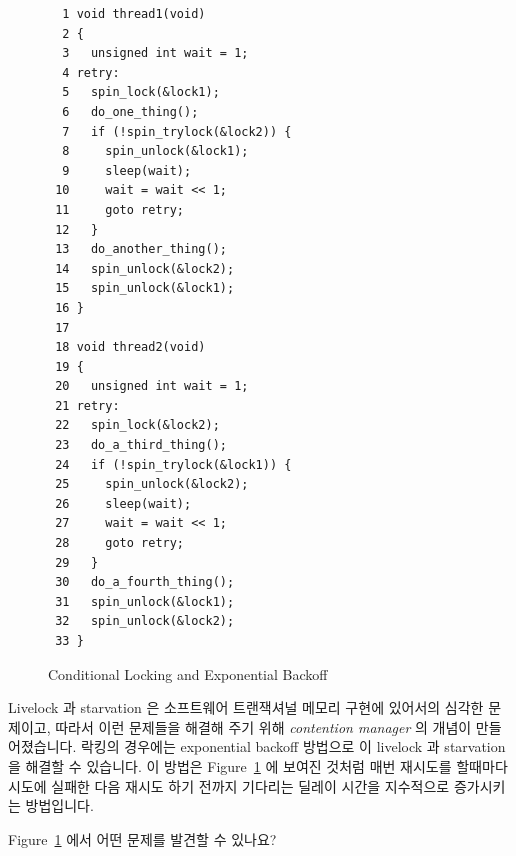 \begin{figure}[tbp]
{ \scriptsize
\begin{verbatim}
  1 void thread1(void)
  2 {
  3   unsigned int wait = 1;
  4 retry:
  5   spin_lock(&lock1);
  6   do_one_thing();
  7   if (!spin_trylock(&lock2)) {
  8     spin_unlock(&lock1);
  9     sleep(wait);
 10     wait = wait << 1;
 11     goto retry;
 12   }
 13   do_another_thing();
 14   spin_unlock(&lock2);
 15   spin_unlock(&lock1);
 16 }
 17 
 18 void thread2(void)
 19 {
 20   unsigned int wait = 1;
 21 retry:
 22   spin_lock(&lock2);
 23   do_a_third_thing();
 24   if (!spin_trylock(&lock1)) {
 25     spin_unlock(&lock2);
 26     sleep(wait);
 27     wait = wait << 1;
 28     goto retry;
 29   }
 30   do_a_fourth_thing();
 31   spin_unlock(&lock1);
 32   spin_unlock(&lock2);
 33 }
\end{verbatim}
}
\caption{Conditional Locking and Exponential Backoff}
\label{fig:locking:Conditional Locking and Exponential Backoff}
\end{figure}

Livelock 과 starvation 은 소프트웨어 트랜잭셔널 메모리 구현에 있어서의 심각한
문제이고, 따라서 이런 문제들을 해결해 주기 위해 \emph{contention manager} 의
개념이 만들어졌습니다.
락킹의 경우에는 exponential backoff 방법으로 이 livelock 과 starvation 을
해결할 수 있습니다.
이 방법은 Figure~\ref{fig:locking:Conditional Locking and Exponential Backoff}
에 보여진 것처럼 매번 재시도를 할때마다 시도에 실패한 다음 재시도 하기 전까지
기다리는 딜레이 시간을 지수적으로 증가시키는 방법입니다.

\QuickQuiz{}
	Figure~\ref{fig:locking:Conditional Locking and Exponential Backoff}
	에서 어떤 문제를 발견할 수 있나요?
	\iffalse

